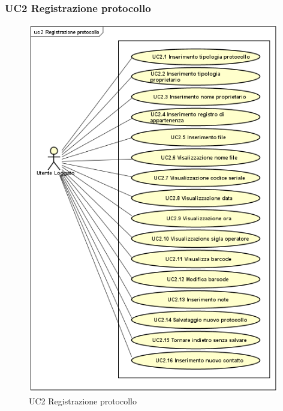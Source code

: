 \subsubsection{UC2 Registrazione protocollo}
    \label{UC2}
    \begin{figure}[!h] 
        \centering 
        \includegraphics[width = 11cm]{immagini/UseCase/registrazioneprotocollo.png}
        \caption{UC2 Registrazione protocollo}
    \end{figure}
    
